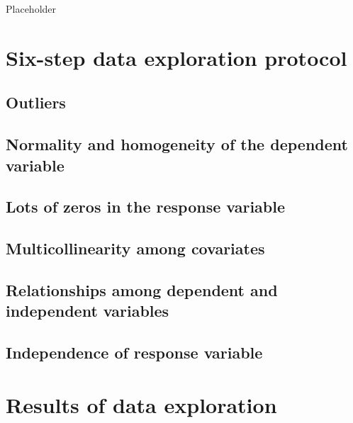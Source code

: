 \documentclass[
]{book}
\begin{document}
Placeholder

\hypertarget{six-step-data-exploration-protocol}{%
\section{Six-step data exploration
protocol}\label{six-step-data-exploration-protocol}}

\hypertarget{outliers}{%
\subsection{Outliers}\label{outliers}}

\hypertarget{normality-and-homogeneity-of-the-dependent-variable}{%
\subsection{Normality and homogeneity of the dependent
variable}\label{normality-and-homogeneity-of-the-dependent-variable}}

\hypertarget{lots-of-zeros-in-the-response-variable}{%
\subsection{Lots of zeros in the response
variable}\label{lots-of-zeros-in-the-response-variable}}

\hypertarget{multicollinearity-among-covariates}{%
\subsection{Multicollinearity among
covariates}\label{multicollinearity-among-covariates}}

\hypertarget{relationships-among-dependent-and-independent-variables}{%
\subsection{Relationships among dependent and independent
variables}\label{relationships-among-dependent-and-independent-variables}}

\hypertarget{independence}{%
\subsection{Independence of response variable}\label{independence}}

\hypertarget{results-of-data-exploration}{%
\section{Results of data
exploration}\label{results-of-data-exploration}}
\end{document}
